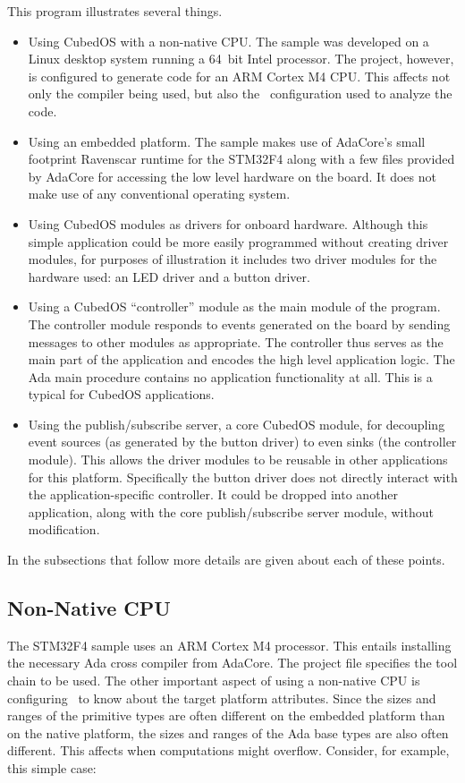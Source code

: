 This program illustrates several things.
\begin{itemize}
\item Using CubedOS with a non-native CPU. The sample was developed on a Linux desktop system
  running a 64~bit Intel processor. The project, however, is configured to generate code for an
  ARM Cortex M4 CPU. This affects not only the compiler being used, but also the \SPARK\
  configuration used to analyze the code.
\item Using an embedded platform. The sample makes use of AdaCore's small footprint Ravenscar
  runtime for the STM32F4 along with a few files provided by AdaCore for accessing the low level
  hardware on the board. It does not make use of any conventional operating system.
\item Using CubedOS modules as drivers for onboard hardware. Although this simple application
  could be more easily programmed without creating driver modules, for purposes of illustration
  it includes two driver modules for the hardware used: an LED driver and a button driver.
\item Using a CubedOS ``controller'' module as the main module of the program. The controller
  module responds to events generated on the board by sending messages to other modules as
  appropriate. The controller thus serves as the main part of the application and encodes the
  high level application logic. The Ada main procedure contains no application functionality at
  all. This is a typical for CubedOS applications.
\item Using the publish/subscribe server, a core CubedOS module, for decoupling event sources
  (as generated by the button driver) to even sinks (the controller module). This allows the
  driver modules to be reusable in other applications for this platform. Specifically the button
  driver does not directly interact with the application-specific controller. It could be
  dropped into another application, along with the core publish/subscribe server module, without
  modification.
\end{itemize}

In the subsections that follow more details are given about each of these points.

\subsection{Non-Native CPU}

The STM32F4 sample uses an ARM Cortex M4 processor. This entails installing the necessary Ada
cross compiler from AdaCore. The project file specifies the tool chain to be used. The other
important aspect of using a non-native CPU is configuring \SPARK\ to know about the target
platform attributes. Since the sizes and ranges of the primitive types are often different on
the embedded platform than on the native platform, the sizes and ranges of the Ada base types
are also often different. This affects when computations might overflow. Consider, for example,
this simple case:

